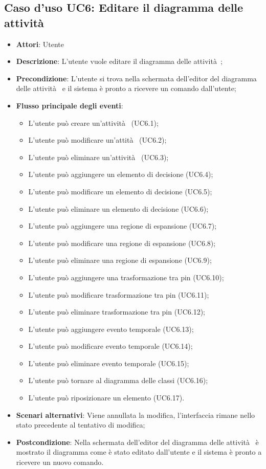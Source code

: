 \documentclass[../AnalisiDeiRequisiti.tex]{subfiles}
\begin{document}
			\subsection{Caso d'uso UC6: Editare il diagramma delle attività }
			\begin{itemize}
				\item \textbf{Attori}: Utente
				\item \textbf{Descrizione}: L'utente vuole editare il diagramma delle attività ;
				\item \textbf{Precondizione}: L'utente si trova nella schermata dell'editor del diagramma delle attività  e il sistema è pronto a ricevere un comando dall'utente;
				\item \textbf{Flusso principale degli eventi}: \begin{itemize}
					\item L'utente può creare un'attività  (UC6.1);
					\item L'utente può modificare un'attità  (UC6.2);
					\item L'utente può eliminare un'attività  (UC6.3);
					\item L'utente può aggiungere un elemento di decisione (UC6.4);
					\item L'utente può modificare un elemento di decisione (UC6.5);
					\item L'utente può eliminare un elemento di decisione (UC6.6);
					\item L'utente può aggiungere una regione di espansione (UC6.7);
					\item L'utente può modificare una regione di espansione (UC6.8);
					\item L'utente può eliminare una regione di espansione (UC6.9);
					\item L'utente può aggiungere una trasformazione tra pin (UC6.10);
					\item L'utente può modificare trasformazione tra pin (UC6.11);
					\item L'utente può eliminare trasformazione tra pin (UC6.12);
					\item L'utente può aggiungere evento temporale (UC6.13);
					\item L'utente può modificare evento temporale (UC6.14);
					\item L'utente può eliminare evento temporale (UC6.15);
					\item L'utente può tornare al diagramma delle classi (UC6.16);
					\item L'utente può riposizionare un elemento (UC6.17).
				\end{itemize}
					\item \textbf{Scenari alternativi}: Viene annullata la modifica, l'interfaccia rimane nello stato precedente al tentativo di modifica;
					\item \textbf{Postcondizione}: Nella schermata dell'editor del diagramma delle attività  è mostrato il diagramma come è stato editato dall'utente e il sistema è pronto a ricevere un nuovo comando.
				\end{itemize}
\end{document}
